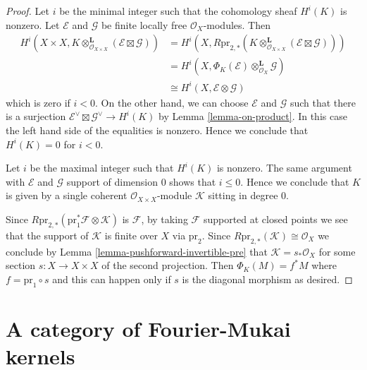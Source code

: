 \begin{proof}
Let $i$ be the minimal integer such that the cohomology sheaf $H^i(K)$ is
nonzero. Let $\mathcal{E}$ and $\mathcal{G}$ be finite locally free
$\mathcal{O}_X$-modules. Then
\begin{align*}
H^i(X \times X, K \otimes_{\mathcal{O}_{X \times X}}^\mathbf{L}
(\mathcal{E} \boxtimes \mathcal{G}))
& =
H^i(X, R\text{pr}_{2, *}(K \otimes_{\mathcal{O}_{X \times X}}^\mathbf{L}
(\mathcal{E} \boxtimes \mathcal{G}))) \\
& =
H^i(X, \Phi_K(\mathcal{E}) \otimes_{\mathcal{O}_X}^\mathbf{L} \mathcal{G}) \\
& \cong
H^i(X, \mathcal{E} \otimes \mathcal{G})
\end{align*}
which is zero if $i < 0$. On the other hand, we can choose
$\mathcal{E}$ and $\mathcal{G}$ such that there is a surjection
$\mathcal{E}^\vee \boxtimes \mathcal{G}^\vee \to H^i(K)$
by Lemma \ref{lemma-on-product}.
In this case the left hand side of the equalities is nonzero.
Hence we conclude that $H^i(K) = 0$ for $i < 0$.

\medskip\noindent
Let $i$ be the maximal integer such that $H^i(K)$ is nonzero.
The same argument with $\mathcal{E}$ and $\mathcal{G}$
support of dimension $0$ shows that $i \leq 0$.
Hence we conclude that $K$ is given by a single coherent
$\mathcal{O}_{X \times X}$-module $\mathcal{K}$ sitting in degree $0$.

\medskip\noindent
Since $R\text{pr}_{2, *}(\text{pr}_1^*\mathcal{F} \otimes \mathcal{K})$
is $\mathcal{F}$, by taking $\mathcal{F}$ supported at closed points
we see that the support of $\mathcal{K}$ is finite over $X$ via
$\text{pr}_2$. Since $R\text{pr}_{2, *}(\mathcal{K}) \cong \mathcal{O}_X$
we conclude by Lemma \ref{lemma-pushforward-invertible-pre}
that $\mathcal{K} = s_*\mathcal{O}_X$ for some section $s : X \to X \times X$
of the second projection. Then $\Phi_K(M) = f^*M$ where
$f = \text{pr}_1 \circ s$ and this can happen only if $s$
is the diagonal morphism as desired.
\end{proof}








\section{A category of Fourier-Mukai kernels}
\label{section-category-Fourier-Mukai-kernels}

